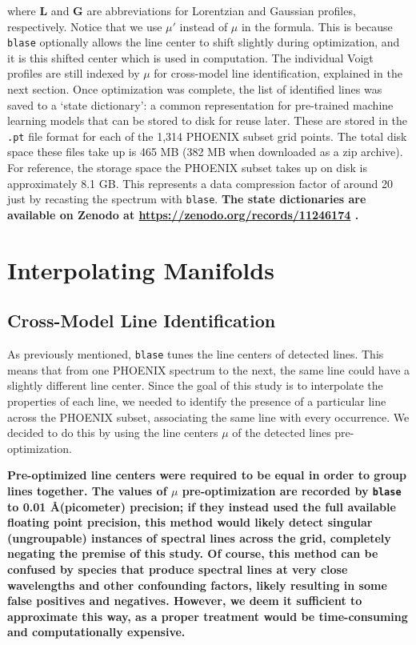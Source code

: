 \documentclass[twocolumn, linenumbers]{aastex631}
\begin{document}
where $\mathbf{L}$ and $\mathbf{G}$ are abbreviations for Lorentzian and Gaussian profiles, respectively.
Notice that we use $\mu'$ instead of $\mu$ in the formula.
This is because \texttt{blase} optionally allows the line center to shift slightly during optimization, and it is this shifted center which is used in computation.
The individual Voigt profiles are still indexed by $\mu$ for cross-model line identification, explained in the next section.
Once optimization was complete, the list of identified lines was saved to a `state dictionary': a common representation for pre-trained machine learning models that can be stored to disk for reuse later.
These are stored in the \texttt{.pt} file format for each of the 1,314 PHOENIX subset grid points.
The total disk space these files take up is 465 MB (382 MB when downloaded as a zip archive).
For reference, the storage space the PHOENIX subset takes up on disk is approximately 8.1 GB.
This represents a data compression factor of around 20 just by recasting the spectrum with \texttt{blase}.
\textbf{The state dictionaries are available on Zenodo at \url{https://zenodo.org/records/11246174} \citep{zenodo}.}

\section{Interpolating Manifolds}
\label{sec:section3}
\subsection{Cross-Model Line Identification}
As previously mentioned, \texttt{blase} tunes the line centers of detected lines.
This means that from one PHOENIX spectrum to the next, the same line could have a slightly different line center.
Since the goal of this study is to interpolate the properties of each line, we needed to identify the presence of a particular line across the PHOENIX subset, associating the same line with every occurrence.
We decided to do this by using the line centers $\mu$ of the detected lines pre-optimization.

\textbf{Pre-optimized line centers were required to be equal in order to group lines together.
The values of $\mu$ pre-optimization are recorded by \texttt{blase} to 0.01 \AA (picometer) precision; if they instead used the full available floating point precision, this method would likely detect singular (ungroupable) instances of spectral lines across the grid, completely negating the premise of this study.
Of course, this method can be confused by species that produce spectral lines at very close wavelengths and other confounding factors, likely resulting in some false positives and negatives.
However, we deem it sufficient to approximate this way, as a proper treatment would be time-consuming and computationally expensive.}
\end{document}
